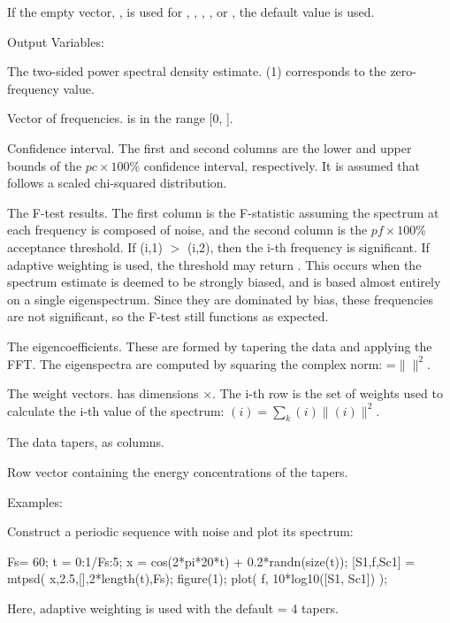 \noindent If the empty vector, \code{[]}, is used for , , , , or , the default value is used.
\bigskip

\noindent Output Variables:

\begin{texitable}
    \item [\var{S}] The two-sided power spectral density estimate.  (1) corresponds to the zero-frequency value.
    \item [\var{f}] Vector of frequencies.   is in the range [0, ].
    \item [\var{Sc}] Confidence interval.  The first and second columns are the lower and upper bounds of the $pc\times100$\% confidence interval, respectively.  It is assumed that  follows a scaled chi-squared distribution.
    \item [\var{FT}] The F-test results.  The first column is the F-statistic assuming the spectrum at each frequency is composed of noise, and the second column is the $pf\times100$\% acceptance threshold.  If (i,1) $>$ (i,2), then the i-th frequency is significant.  If adaptive weighting is used, the threshold may return .  This occurs when the spectrum estimate is deemed to be strongly biased, and is based almost entirely on a single eigenspectrum.  Since they are dominated by bias, these frequencies are not significant, so the F-test still functions as expected.
    \item [\var{Jk}]  The eigencoefficients.  These are formed by tapering the data and applying the FFT.  The eigenspectra are computed by squaring the complex norm: =$\|$$\|^2$.
    \item [\var{wk}] The weight vectors.   has dimensions $\times$.  The i-th row is the set of weights used to calculate the i-th value of the spectrum: $(i)=\sum_k$$(i)\|$$(i)\|^2$. 
    \item [\var{h}] The data tapers, as columns.
    \item [\var{l}] Row vector containing the energy concentrations of the tapers.
\end{texitable}
\bigskip

\noindent Examples:
\medskip

\noindent Construct a periodic sequence with noise and plot its spectrum:
\begin{texiexample}
    Fs= 60;
    t = 0:1/Fs:5;
    x = cos(2*pi*20*t) + 0.2*randn(size(t));
    [S1,f,Sc1] = mtpsd( x,2.5,[],2*length(t),Fs);
    figure(1);
    plot( f, 10*log10([S1, Sc1]) );
\end{texiexample}
Here, adaptive weighting is used with the default  = 4 tapers.
\medskip


